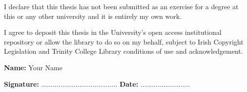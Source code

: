

\begin{declaration}      

I declare that this thesis has not been submitted as an exercise for a degree at this or
any other university and it is entirely my own work.

\vspace{10mm}

I agree to deposit this thesis in the University's open access institutional repository or
allow the library to do so on my behalf, subject to Irish Copyright Legislation and
Trinity College Library conditions of use and acknowledgement.

\vspace{30mm}

\textbf{Name:} Your Name	

\vspace{15mm}

\textbf{Signature:}  ........................................		\textbf{Date:}  ..........................



\end{declaration}

\newpage
\thispagestyle{empty}
\mbox{}



